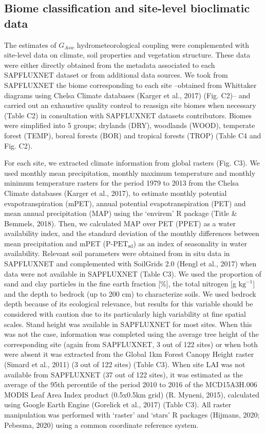 \documentclass[11pt,twoside]{reedthesis}
\begin{document}
\subsection{Biome classification and site-level bioclimatic
data}\label{biome-classification-and-site-level-bioclimatic-data}

The estimates of \(G_{Asw}\) hydrometeorological coupling were
complemented with site-level data on climate, soil properties and
vegetation structure. These data were either directly obtained from the
metadata associated to each SAPFLUXNET dataset or from additional data
sources. We took from SAPFLUXNET the biome corresponding to each site
--obtained from Whittaker diagrams using Chelsa Climate databases
(Karger et al., 2017) (Fig. C2)-- and carried out an exhaustive quality
control to reassign site biomes when necessary (Table C2) in
consultation with SAPFLUXNET datasets contributors. Biomes were
simplified into 5 groups; drylands (DRY), woodlands (WOOD), temperate
forest (TEMP), boreal forests (BOR) and tropical forests (TROP) (Table
C4 and Fig. C2).\par

For each site, we extracted climate information from global rasters
(Fig. C3). We used monthly mean precipitation, monthly maximum
temperature and monthly minimum temperature rasters for the period 1979
to 2013 from the Chelsa Climate databases (Karger et al., 2017), to
estimate monthly potential evapotranspiration (mPET), annual potential
evapotranspiration (PET) and mean annual precipitation (MAP) using the
`envirem' R package (Title \& Bemmels, 2018). Then, we calculated MAP
over PET (PPET) as a water availability index, and the standard
deviation of the monthly differences between mean precipitation and mPET
(\(\text{P-PET}_{\text{sd}}\)) as an index of seasonality in water
availability. Relevant soil parameters were obtained from in situ data
in SAPFLUXNET and complemented with SoilGrids 2.0 (Hengl et al., 2017)
when data were not available in SAPFLUXNET (Table C3). We used the
proportion of sand and clay particles in the fine earth fraction
{[}\%{]}, the total nitrogen {[}g \(\text{kg}^{-1}\){]} and the depth to
bedrock (up to 200 cm) to characterize soils. We used bedrock depth
because of its ecological relevance, but results for this variable
should be considered with caution due to its particularly high
variability at fine spatial scales. Stand height was available in
SAPFLUXNET for most sites. When this was not the case, information was
completed using the average tree height of the corresponding site (again
from SAPFLUXNET, 3 out of 122 sites) or when both were absent it was
extracted from the Global 1km Forest Canopy Height raster (Simard et
al., 2011) (3 out of 122 sites) (Table C3). When site LAI was not
available from SAPFLUXNET (37 out of 122 sites), it was estimated as the
average of the 95th percentile of the period 2010 to 2016 of the
MCD15A3H.006 MODIS Leaf Area Index product (0.5x0.5km grid) (R. Myneni,
2015), calculated using Google Earth Engine (Gorelick et al., 2017)
(Table C3). All raster manipulation was performed with `raster' and
`stars' R packages (Hijmans, 2020; Pebesma, 2020) using a common
coordinate reference system.\par
\end{document}
